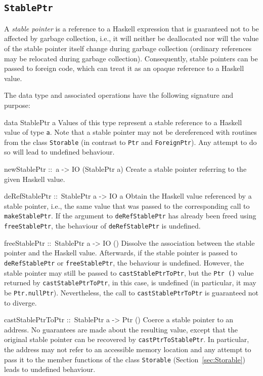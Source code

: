 \documentclass[a4paper,twoside]{article}
\makeatletter
\newcommand{\code}[1]{\texttt{#1}}      %
\newenvironment{codedesc}{%
  \list{}{\labelwidth\z@
    \let\makelabel\codedesclabel}
  }{%
  \endlist
  }
\newcommand*{\codedesclabel}[1]{%
  \hspace{-\leftmargin}
  \parbox[b]{\labelwidth}{\makebox[0pt][l]{\code{#1}}\\}\hfil\relax
  }
\makeatother
\begin{document}
\subsection{\code{StablePtr}}
\label{sec:StablePtr}

A \emph{stable pointer} is a reference to a Haskell expression that is
guaranteed not to be affected by garbage collection, i.e., it will neither be
deallocated nor will the value of the stable pointer itself change during
garbage collection (ordinary references may be relocated during garbage
collection).  Consequently, stable pointers can be passed to foreign code,
which can treat it as an opaque reference to a Haskell value.

The data type and associated operations have the following signature and
purpose:
%
\begin{codedesc}
\item[data StablePtr a] Values of this type represent a stable reference to a
  Haskell value of type \code{a}.  Note that a stable pointer may not be
  dereferenced with routines from the class \code{Storable} (in contrast to
  \code{Ptr} and \code{ForeignPtr}).  Any attempt to do so will lead to
  undefined behaviour.
  
\item[newStablePtr ::\ a -> IO (StablePtr a)] Create a stable pointer
  referring to the given Haskell value.
  
\item[deRefStablePtr ::\ StablePtr a -> IO a] Obtain the Haskell value
  referenced by a stable pointer, i.e., the same value that was passed to the
  corresponding call to \code{makeStablePtr}.  If the argument to
  \code{deRefStablePtr} has already been freed using \code{freeStablePtr}, the
  behaviour of \code{deRefStablePtr} is undefined.
  
\item[freeStablePtr ::\ StablePtr a -> IO ()] Dissolve the association between
  the stable pointer and the Haskell value. Afterwards, if the stable pointer
  is passed to \code{deRefStablePtr} or \code{freeStablePtr}, the behaviour is
  undefined.  However, the stable pointer may still be passed to
  \code{castStablePtrToPtr}, but the \code{Ptr ()} value returned by
  \code{castStablePtrToPtr}, in this case, is undefined (in particular, it may
  be \code{Ptr.nullPtr}).  Nevertheless, the call to \code{castStablePtrToPtr}
  is guaranteed not to diverge.
  
\item[castStablePtrToPtr ::\ StablePtr a -> Ptr ()] Coerce a stable pointer to
  an address. No guarantees are made about the resulting value, except that
  the original stable pointer can be recovered by \code{castPtrToStablePtr}.
  In particular, the address may not refer to an accessible memory location and
  any attempt to pass it to the member functions of the class \code{Storable}
  (Section~\ref{sec:Storable}) leads to undefined behaviour.
  

\end{codedesc}
\end{document}
